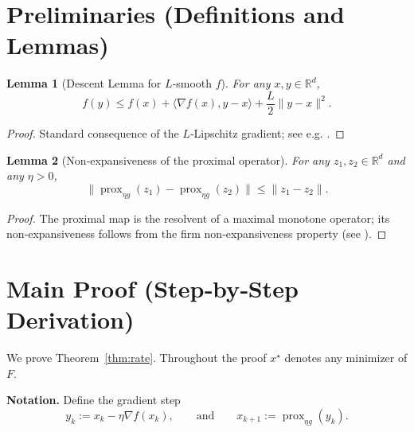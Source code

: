 \documentclass{article}
\newtheorem{lemma}{Lemma}
\newcommand{\prox}{\operatorname{prox}}
\newcommand{\R}{\mathbb{R}}
\begin{document}
\section*{Preliminaries (Definitions and Lemmas)}
\begin{lemma}[Descent Lemma for $L$‑smooth $f$]\label{lem:descent}
For any $x,y\in\R^{d}$,
\[
f(y)\le f(x)+\langle\nabla f(x),y-x\rangle+\frac{L}{2}\|y-x\|^{2}.
\tag{L1}
\]
\end{lemma}
\begin{proof}
Standard consequence of the $L$‑Lipschitz gradient; see e.g. \cite{nesterov2004}.
\end{proof}

\begin{lemma}[Non‑expansiveness of the proximal operator]\label{lem:prox}
For any $z_{1},z_{2}\in\R^{d}$ and any $\eta>0$,
\[
\|\prox_{\eta g}(z_{1})-\prox_{\eta g}(z_{2})\|\le\|z_{1}-z_{2}\|.
\tag{L2}
\]
\end{lemma}
\begin{proof}
The proximal map is the resolvent of a maximal monotone operator; its non‑expansiveness follows from the firm non‑expansiveness property (see \cite{parikh2014proximal}).
\end{proof}

\section*{Main Proof (Step‑by‑Step Derivation)}
We prove Theorem~\ref{thm:rate}. Throughout the proof $x^{\star}$ denotes any minimizer of $F$.

\noindent\textbf{Notation.} Define the gradient step
\[
y_{k}:=x_{k}-\eta\nabla f(x_{k}),\qquad\text{and}\qquad x_{k+1}:=\prox_{\eta g}(y_{k}).
\]
\end{document}
